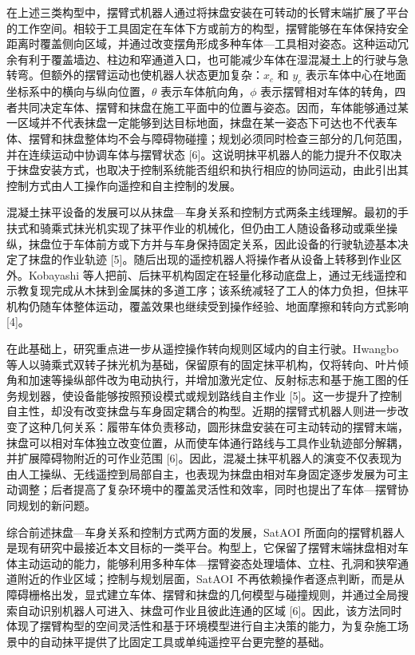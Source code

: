 在上述三类构型中，摆臂式机器人通过将抹盘安装在可转动的长臂末端扩展了平台的工作空间。相较于工具固定在车体下方或前方的构型，摆臂能够在车体保持安全距离时覆盖侧向区域，并通过改变摆角形成多种车体—工具相对姿态。这种运动冗余有利于覆盖墙边、柱边和窄通道入口，也可能减少车体在湿混凝土上的行驶与急转弯。但额外的摆臂运动也使机器人状态更加复杂：$x_c$ 和 $y_c$ 表示车体中心在地面坐标系中的横向与纵向位置，$\theta$ 表示车体航向角，$\phi$ 表示摆臂相对车体的转角，四者共同决定车体、摆臂和抹盘在施工平面中的位置与姿态。因而，车体能够通过某一区域并不代表抹盘一定能够到达目标地面，抹盘在某一姿态下可达也不代表车体、摆臂和抹盘整体均不会与障碍物碰撞；规划必须同时检查三部分的几何范围，并在连续运动中协调车体与摆臂状态 [6]。这说明抹平机器人的能力提升不仅取决于抹盘安装方式，也取决于控制系统能否组织和执行相应的协同运动，由此引出其控制方式由人工操作向遥控和自主控制的发展。

  

混凝土抹平设备的发展可以从抹盘—车身关系和控制方式两条主线理解。最初的手扶式和骑乘式抹光机实现了抹平作业的机械化，但仍由工人随设备移动或乘坐操纵，抹盘位于车体前方或下方并与车身保持固定关系，因此设备的行驶轨迹基本决定了抹盘的作业轨迹 [5]。随后出现的遥控机器人将操作者从设备上转移到作业区外。Kobayashi 等人把前、后抹平机构固定在轻量化移动底盘上，通过无线遥控和示教复现完成从木抹到金属抹的多道工序；该系统减轻了工人的体力负担，但抹平机构仍随车体整体运动，覆盖效果也继续受到操作经验、地面摩擦和转向方式影响 [4]。

在此基础上，研究重点进一步从遥控操作转向规则区域内的自主行驶。Hwangbo 等人以骑乘式双转子抹光机为基础，保留原有的固定抹平机构，仅将转向、叶片倾角和加速等操纵部件改为电动执行，并增加激光定位、反射标志和基于施工图的任务规划器，使设备能够按照预设模式或规划路线自主作业 [5]。这一步提升了控制自主性，却没有改变抹盘与车身固定耦合的构型。近期的摆臂式机器人则进一步改变了这种几何关系：履带车体负责移动，圆形抹盘安装在可主动转动的摆臂末端，抹盘可以相对车体独立改变位置，从而使车体通行路线与工具作业轨迹部分解耦，并扩展障碍物附近的可作业范围 [6]。因此，混凝土抹平机器人的演变不仅表现为由人工操纵、无线遥控到局部自主，也表现为抹盘由相对车身固定逐步发展为可主动调整；后者提高了复杂环境中的覆盖灵活性和效率，同时也提出了车体—摆臂协同规划的新问题。

  

综合前述抹盘—车身关系和控制方式两方面的发展，SatAOI 所面向的摆臂机器人是现有研究中最接近本文目标的一类平台。构型上，它保留了摆臂末端抹盘相对车体主动运动的能力，能够利用多种车体—摆臂姿态处理墙体、立柱、孔洞和狭窄通道附近的作业区域；控制与规划层面，SatAOI 不再依赖操作者逐点判断，而是从障碍栅格出发，显式建立车体、摆臂和抹盘的几何模型与碰撞规则，并通过全局搜索自动识别机器人可进入、抹盘可作业且彼此连通的区域 [6]。因此，该方法同时体现了摆臂构型的空间灵活性和基于环境模型进行自主决策的能力，为复杂施工场景中的自动抹平提供了比固定工具或单纯遥控平台更完整的基础。

